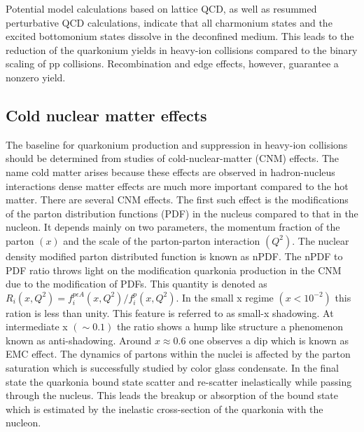 Potential model calculations based on lattice QCD, as well as resummed 
perturbative QCD calculations, indicate that all charmonium states and the
excited bottomonium states dissolve in the deconfined medium. This leads to 
the reduction of the quarkonium yields in heavy-ion collisions 
compared to the binary scaling of pp collisions. Recombination and edge
effects, however, guarantee a nonzero yield.


              
\subsection{Cold nuclear matter effects}

The baseline for quarkonium production and suppression in heavy-ion collisions 
should be determined from studies of
cold-nuclear-matter (CNM) effects. The name cold matter 
arises because these effects are observed in hadron-nucleus interactions 
dense matter effects are much more important compared to the hot matter.  There are several 
CNM effects. The first such effect is the modifications of the parton 
distribution functions (PDF) in the nucleus compared to that in the nucleon. It depends mainly on two parameters, 
the momentum fraction of the parton $(x)$ and the scale of the parton-parton 
interaction $(Q^2)$. The nuclear density modified parton distributed function is known 
as nPDF. The nPDF to PDF ratio throws light on the modification quarkonia production 
in the CNM due to the modification of PDFs. This quantity is denoted as $R_i(x,Q^2)=f_i^{p \epsilon A} (x, Q^2) /
f_i^p  (x, Q^2)$. In the small x regime $(x < 10^{-2})$ this ration is less than unity. This feature is referred to as 
small-x shadowing. At intermediate x $(\sim 0.1)$ the ratio shows a hump like structure a phenomenon known as 
anti-shadowing. Around $x\approx 0.6$ one observes a dip which is known as EMC effect. The dynamics of partons 
within the nuclei is affected by the parton saturation which is successfully studied by color glass condensate. In the 
final state the quarkonia bound state scatter and re-scatter inelastically while passing through the nucleus. This leads 
the breakup or absorption of the bound state which is estimated by the inelastic cross-section of the quarkonia with 
the nucleon. 

